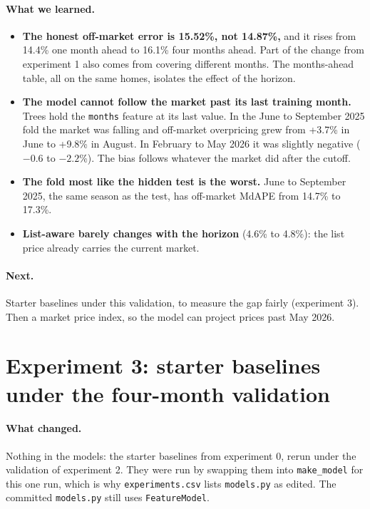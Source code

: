 \documentclass[11pt]{article}
\begin{document}
\paragraph{What we learned.}
\begin{itemize}
\item \textbf{The honest off-market error is 15.52\%, not 14.87\%,} and it rises from 14.4\% one
  month ahead to 16.1\% four months ahead. Part of the change from experiment 1 also comes from
  covering different months. The months-ahead table, all on the same homes, isolates the
  effect of the horizon.
\item \textbf{The model cannot follow the market past its last training month.} Trees hold the
  \texttt{months} feature at its last value. In the June to September 2025 fold the market was
  falling and off-market overpricing grew from +3.7\% in June to +9.8\% in August. In February to
  May 2026 it was slightly negative ($-0.6$ to $-2.2$\%). The bias follows whatever the market did
  after the cutoff.
\item \textbf{The fold most like the hidden test is the worst.} June to September 2025, the same
  season as the test, has off-market MdAPE from 14.7\% to 17.3\%.
\item \textbf{List-aware barely changes with the horizon} (4.6\% to 4.8\%): the list price already
  carries the current market.
\end{itemize}

\paragraph{Next.}
Starter baselines under this validation, to measure the gap fairly (experiment 3). Then a market
price index, so the model can project prices past May 2026.

\section*{Experiment 3: starter baselines under the four-month validation}

\paragraph{What changed.}
Nothing in the models: the starter baselines from experiment 0, rerun under the validation of
experiment 2. They were run by swapping them into \texttt{make\_model} for this one run, which
is why \texttt{experiments.csv} lists \texttt{models.py} as edited. The committed
\texttt{models.py} still uses \texttt{FeatureModel}.
\end{document}
